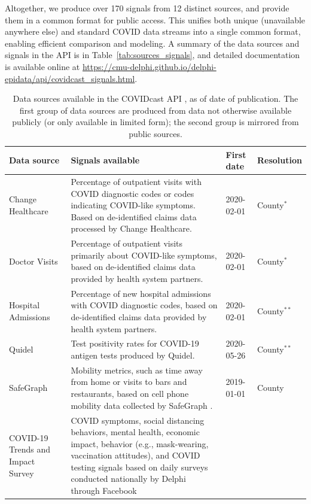 \documentclass[9pt,twocolumn,twoside,lineno]{pnas-new}
\begin{document}
Altogether, we produce over 170 signals from 12 distinct sources, and provide
them in a common format for public access. This unifies both unique (unavailable
anywhere else) and standard COVID data streams into a single common 
format, enabling efficient comparison and modeling. A summary of the data
sources and signals in the API is in Table~\ref{tab:sources_signals}, and
detailed documentation is available online at
\url{https://cmu-delphi.github.io/delphi-epidata/api/covidcast_signals.html}. 

\begin{table}[t]
\centering
\caption{Data sources available in the COVIDcast API \cite{CovidcastAPI}, as of
  date of publication. The first group of data sources are produced from data
  not otherwise available publicly (or only available in limited form); the
  second group is mirrored from public sources.}
\begin{tabular}{>{\raggedright}p{1.2in} p{4.0in} l >{\raggedright\arraybackslash}p{0.5in}}
  \toprule
  \textbf{Data source} & \textbf{Signals available} & \textbf{First date} &
\textbf{Resolution} \\\midrule
  Change Healthcare & Percentage of outpatient visits with COVID diagnostic
codes or codes indicating COVID-like symptoms. Based on de-identified claims
data processed by Change Healthcare. & 2020-02-01 & County$^*$ \\
  Doctor Visits & Percentage of outpatient visits primarily about COVID-like
symptoms, based on de-identified claims data provided by health system
partners. & 2020-02-01 & County$^*$ \\
  Hospital Admissions & Percentage of new hospital admissions with COVID
diagnostic codes, based on de-identified claims data provided by health system
partners. & 2020-02-01 & County$^{**}$\\
  Quidel & Test positivity rates for COVID-19 antigen tests produced by
Quidel. & 2020-05-26 & County$^{**}$ \\
  SafeGraph & Mobility metrics, such as time away from home or visits to bars
and restaurants, based on cell phone mobility data collected by SafeGraph
\cite{SafeGraphSocial, SafeGraphPatterns}. & 2019-01-01 & County \\
  COVID-19 Trends and Impact Survey & COVID symptoms, social distancing
behaviors, mental health, economic impact, behavior (e.g., mask-wearing,
vaccination attitudes), and COVID testing signals based on daily surveys
conducted nationally by Delphi through Facebook \cite{Salomon:2021,
}
\end{tabular}
\end{table}
\end{document}
